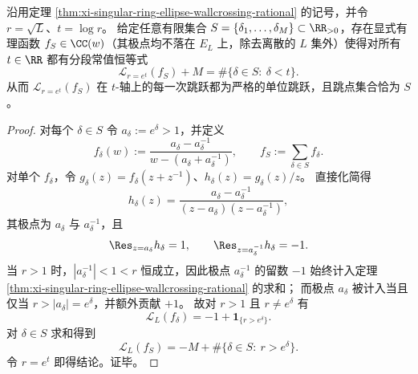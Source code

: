 \begin{corollary}\label{cor:xi-ellipse-wallcrossing-unit-staircase-universality}
沿用定理 \ref{thm:xi-singular-ring-ellipse-wallcrossing-rational} 的记号，并令 \(r=\sqrt{L}\)、\(t=\log r\)。
给定任意有限集合 \(S=\{\delta_1,\dots,\delta_M\}\subset\RR_{>0}\)，存在显式有理函数 \(f_S\in\CC(w)\)（其极点均不落在 \(E_L\) 上，除去离散的 \(L\) 集外）使得对所有 \(t\in\RR\) 都有分段常值恒等式
\[
\mathcal{L}_{r=e^{t}}(f_S)+M
=
\#\{\delta\in S:\ \delta<t\}.
\]
从而 \(\mathcal{L}_{r=e^t}(f_S)\) 在 \(t\)-轴上的每一次跳跃都为严格的单位跳跃，且跳点集合恰为 \(S\)。
\end{corollary}
\begin{proof}
对每个 \(\delta\in S\) 令 \(a_\delta:=e^{\delta}>1\)，并定义
\[
f_\delta(w):=\frac{a_\delta-a_\delta^{-1}}{w-(a_\delta+a_\delta^{-1})},
\qquad
f_S:=\sum_{\delta\in S} f_\delta.
\]
对单个 \(f_\delta\)，令 \(g_\delta(z)=f_\delta(z+z^{-1})\)、\(h_\delta(z)=g_\delta(z)/z\)。
直接化简得
\[
h_\delta(z)=\frac{a_\delta-a_\delta^{-1}}{(z-a_\delta)(z-a_\delta^{-1})},
\]
其极点为 \(a_\delta\) 与 \(a_\delta^{-1}\)，且
\[
\Res_{z=a_\delta}h_\delta=1,\qquad \Res_{z=a_\delta^{-1}}h_\delta=-1.
\]
当 \(r>1\) 时，\(|a_\delta^{-1}|<1<r\) 恒成立，因此极点 \(a_\delta^{-1}\) 的留数 \(-1\) 始终计入定理 \ref{thm:xi-singular-ring-ellipse-wallcrossing-rational} 的求和；
而极点 \(a_\delta\) 被计入当且仅当 \(r>|a_\delta|=e^\delta\)，并额外贡献 \(+1\)。
故对 \(r>1\) 且 \(r\neq e^\delta\) 有
\[
\mathcal{L}_L(f_\delta)=-1+\mathbf 1_{\{r>e^\delta\}}.
\]
对 \(\delta\in S\) 求和得到
\[
\mathcal{L}_L(f_S)=-M+\#\{\delta\in S:\ r>e^\delta\}.
\]
令 \(r=e^t\) 即得结论。证毕。
\end{proof}
